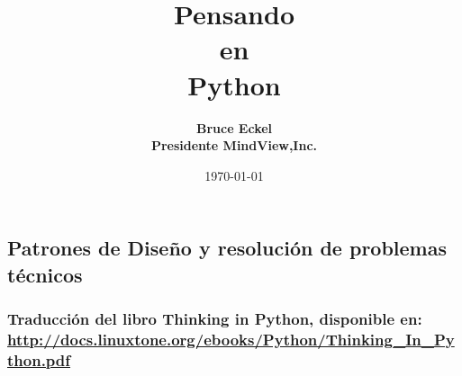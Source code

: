 \documentclass{article}
\title{\Huge \textbf{Pensando \\ en \\ Python}}
\author{\textbf{\large Bruce Eckel} \\ \textbf{Presidente MindView,Inc.}}
\date{\large \today}
\begin{document}
\maketitle

\begin{center}

\vspace{1.6cm}

\subsection*{\large Patrones de Diseño y resolución de problemas técnicos}

\vspace{1.6cm}

\subsubsection*{Traducción del libro Thinking in Python, disponible en: \url{http://docs.linuxtone.org/ebooks/Python/Thinking_In_Python.pdf} }


\end{center}

\newpage

\tableofcontents

\newpage







\end{document}
